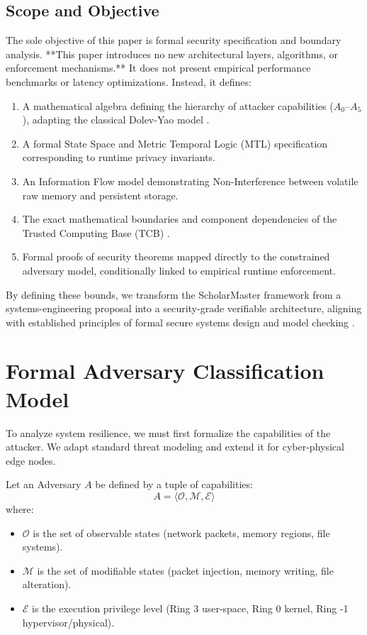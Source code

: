 \documentclass[conference]{IEEEtran}
\begin{document}
\subsection{Scope and Objective}
The sole objective of this paper is formal security specification and boundary analysis. **This paper introduces no new architectural layers, algorithms, or enforcement mechanisms.** It does not present empirical performance benchmarks or latency optimizations. Instead, it defines:
\begin{enumerate}
    \item A mathematical algebra defining the hierarchy of attacker capabilities ($A_0$--$A_5$), adapting the classical Dolev-Yao model \cite{b2}.
    \item A formal State Space and Metric Temporal Logic (MTL) specification \cite{b9} corresponding to runtime privacy invariants.
    \item An Information Flow model demonstrating Non-Interference \cite{b8, b11} between volatile raw memory and persistent storage.
    \item The exact mathematical boundaries and component dependencies of the Trusted Computing Base (TCB) \cite{b3}.
    \item Formal proofs of security theorems mapped directly to the constrained adversary model, conditionally linked to empirical runtime enforcement.
\end{enumerate}

By defining these bounds, we transform the ScholarMaster framework from a systems-engineering proposal into a security-grade verifiable architecture, aligning with established principles of formal secure systems design and model checking \cite{b10}.

\section{Formal Adversary Classification Model}
To analyze system resilience, we must first formalize the capabilities of the attacker. We adapt standard threat modeling \cite{b2} and extend it for cyber-physical edge nodes.

Let an Adversary $A$ be defined by a tuple of capabilities:
\begin{equation}
A = \langle \mathcal{O}, \mathcal{M}, \mathcal{E} \rangle
\end{equation}
where:
\begin{itemize}
    \item $\mathcal{O}$ is the set of observable states (network packets, memory regions, file systems).
    \item $\mathcal{M}$ is the set of modifiable states (packet injection, memory writing, file alteration).
    \item $\mathcal{E}$ is the execution privilege level (Ring 3 user-space, Ring 0 kernel, Ring -1 hypervisor/physical).
\end{itemize}
\end{document}
